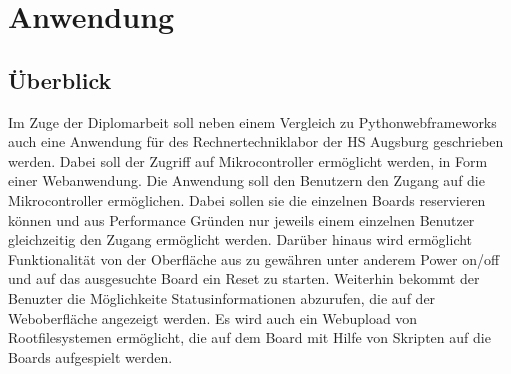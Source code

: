 \chapter{Anwendung}
\section{Überblick}
Im Zuge der Diplomarbeit soll neben einem Vergleich zu Pythonwebframeworks auch
eine Anwendung für des Rechnertechniklabor der HS Augsburg geschrieben werden.
Dabei soll der Zugriff auf Mikrocontroller ermöglicht werden, in Form einer
Webanwendung. Die Anwendung soll den Benutzern den Zugang auf die
Mikrocontroller ermöglichen. Dabei sollen sie die einzelnen Boards reservieren
können und aus Performance Gründen nur jeweils einem einzelnen Benutzer
gleichzeitig den Zugang ermöglicht werden. Darüber hinaus wird ermöglicht
Funktionalität von der Oberfläche aus zu gewähren unter anderem Power on/off
und auf das ausgesuchte Board ein Reset zu starten. Weiterhin bekommt der
Benuzter die Möglichkeite Statusinformationen abzurufen, die auf der
Weboberfläche angezeigt werden. Es wird auch ein Webupload von Rootfilesystemen
ermöglicht, die auf dem Board mit Hilfe von Skripten auf die Boards aufgespielt
werden. 
